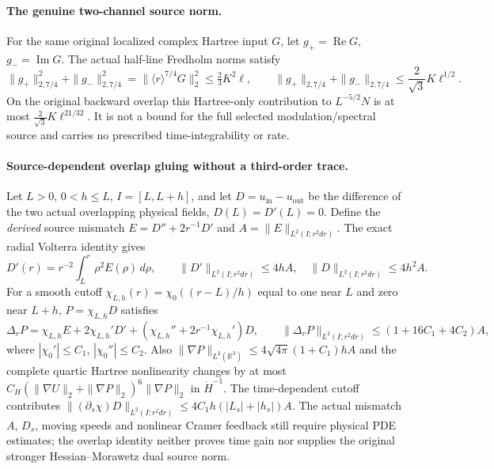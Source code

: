 \documentclass[11pt]{amsart}
\begin{document}
\paragraph{The genuine two-channel source norm.}
For the same original localized complex Hartree input \(G\), let
\(g_+=\operatorname{Re}G\), \(g_-=\operatorname{Im}G\).
The actual half-line Fredholm norms satisfy
\[
 \|g_+\|_{2,7/4}^2+\|g_-\|_{2,7/4}^2
 =\|\langle r\rangle^{7/4}G\|_2^2
 \le \tfrac23 K^2\ell,\qquad
 \|g_+\|_{2,7/4}+\|g_-\|_{2,7/4}
 \le \frac2{\sqrt3}K\ell^{1/2}.
\]
On the original backward overlap this Hartree-only contribution to
\(L^{-5/2}N\) is at most
\(\frac2{\sqrt3}K\ell^{21/32}\).
It is not a bound for the full selected modulation/spectral source
and carries no prescribed time-integrability or rate.


\paragraph{Source-dependent overlap gluing without a third-order trace.}
Let $L>0$, $0<h\le L$, $I=[L,L+h]$, and let $D=u_{\mathrm{in}}-u_{\mathrm{out}}$
be the difference of the two actual overlapping physical fields,
$D(L)=D'(L)=0$. Define the \emph{derived} source mismatch
$E=D''+2r^{-1}D'$ and $A=\|E\|_{L^2(I;r^2dr)}$.
The exact radial Volterra identity gives
\[
 D'(r)=r^{-2}\int_L^r\rho^2E(\rho)\,d\rho,\qquad
 \|D'\|_{L^2(I;r^2dr)}\le4hA,\quad
 \|D\|_{L^2(I;r^2dr)}\le4h^2A.
\]
For a smooth cutoff $\chi_{L,h}(r)=\chi_0((r-L)/h)$ equal to one
near $L$ and zero near $L+h$, $P=\chi_{L,h}D$ satisfies
\[
 \Delta_rP=\chi_{L,h}E+
  2\chi_{L,h}'D'+(\chi_{L,h}''+2r^{-1}\chi_{L,h}')D,
 \qquad
 \|\Delta_rP\|_{L^2(I;r^2dr)}
  \le(1+16C_1+4C_2)A,
\]
where $|\chi_0'|\le C_1$, $|\chi_0''|\le C_2$.
Also $\|\nabla P\|_{L^2(\mathbb R^3)}
\le4\sqrt{4\pi}(1+C_1)hA$ and the complete quartic Hartree
nonlinearity changes by at most
$C_H(\|\nabla U\|_2+\|\nabla P\|_2)^6\|\nabla P\|_2$
in $\dot H^{-1}$. The time-dependent cutoff contributes
$\|(\partial_s\chi)D\|_{L^2(I;r^2dr)}
\le4C_1h(|L_s|+|h_s|)A$.
The actual mismatch $A$, $D_s$, moving speeds and nonlinear Cramer
feedback still require physical PDE estimates; the overlap identity
neither proves time gain nor supplies the original stronger
Hessian--Morawetz dual source norm.
\end{document}
